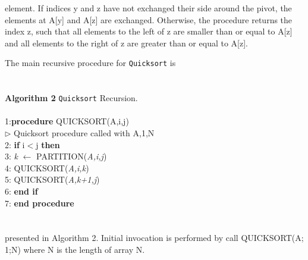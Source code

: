 \documentclass{article}
\begin{document}
\begin{multicols}{2}
element. If indices y and z have not exchanged
their side around the pivot, the elements at A[y]
and A[z] are exchanged. Otherwise, the procedure
returns the index z, such that all elements to the
left of z are smaller than or equal to A[z] and all
elements to the right of z are greater than or equal
to A[z].\par
The main recursive procedure for \texttt{Quicksort} is\\\\
\noindent\makebox[\linewidth]{\rule{0.5\textwidth}{1.2pt}}\\
\noindent\textbf{Algorithm 2} \texttt{Quicksort} Recursion.\\
\noindent\makebox[\linewidth]{\rule{0.5\textwidth}{0.4pt}}\\
1:\textbf{procedure} QUICKSORT(A,i,j)\\
\hspace{4ex} $\triangleright$ Quicksort procedure called with A,1,N\\
2: \hspace{4ex} \textbf{if} i$<$j \textbf{then}\\
3: \hspace{4ex} \hspace{4ex} \textit{k} $\leftarrow$ PARTITION(\textit{A,i,j})\\
4: \hspace{4ex} \hspace{4ex} QUICKSORT(\textit{A,i,k})\\
5: \hspace{4ex} \hspace{4ex} QUICKSORT(\textit{A,k+1,j})\\
6: \hspace{4ex} \textbf{end if}\\
7: \textbf{end procedure}\\
\noindent\makebox[\linewidth]{\rule{0.5\textwidth}{0.4pt}}\\
\\
presented in Algorithm 2. Initial invocation is performed by call QUICKSORT(A; 1;N) where N is
the length of array N.


\end{multicols}
\end{document}
